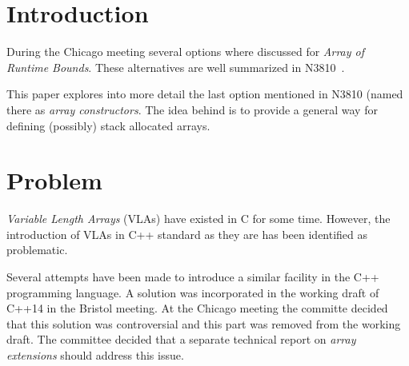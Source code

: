 \section{Introduction}

During the Chicago meeting several options where discussed for \emph{Array of
Runtime Bounds}. These alternatives are well summarized in N3810~\cite{n3810}.

This paper explores into more detail the last option mentioned in N3810 (named
there as \emph{array constructors}. The idea behind is to provide a general way
for defining (possibly) stack allocated arrays.

\section{Problem}

\emph{Variable Length Arrays} (VLAs) have existed in C for some time. However,
the introduction of VLAs in C++ standard as they are has been identified as
problematic.

Several attempts have been made to introduce a similar facility in the C++
programming language. A solution was incorporated in the working draft of C++14
in the Bristol meeting. At the Chicago meeting the committe decided that this
solution was controversial and this part was removed from the working draft. The
committee decided that a separate technical report on \emph{array extensions}
should address this issue.




